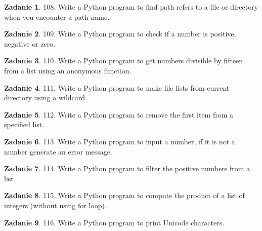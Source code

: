 \documentclass[11pt]{article}
\theoremstyle{definition}
\newtheorem{zadanie}{Zadanie}
\begin{document}
\begin{zadanie}


108. Write a Python program to find path refers to a file or directory when you encounter a path name. 

\end{zadanie}

\begin{zadanie}


109. Write a Python program to check if a number is positive, negative or zero. 

\end{zadanie}

\begin{zadanie}


110. Write a Python program to get numbers divisible by fifteen from a list using an anonymous function. 

\end{zadanie}

\begin{zadanie}


111. Write a Python program to make file lists from current directory using a wildcard. 

\end{zadanie}

\begin{zadanie}


112. Write a Python program to remove the first item from a specified list. 

\end{zadanie}

\begin{zadanie}


113. Write a Python program to input a number, if it is not a number generate an error message. 

\end{zadanie}

\begin{zadanie}


114. Write a Python program to filter the positive numbers from a list. 

\end{zadanie}

\begin{zadanie}


115. Write a Python program to compute the product of a list of integers (without using for loop). 

\end{zadanie}

\begin{zadanie}


116. Write a Python program to print Unicode characters. 

\end{zadanie}
\end{document}
